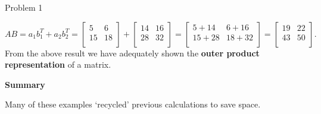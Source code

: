 \begin{problem}{Problem 1}
\begin{Highlight}[Solution]
        \begin{equation*}
            AB = a_{1}b_{1}^{T} + a_{2}b_{2}^{T} = 
            \begin{bmatrix}
                5 & 6 \\
                15 & 18 \\
            \end{bmatrix}
            + 
            \begin{bmatrix}
                14 & 16 \\
                28 & 32 \\
            \end{bmatrix}
            = 
            \begin{bmatrix}
                5 + 14 & 6 + 16 \\
                15 + 28 & 18 + 32 \\
            \end{bmatrix}
            = 
            \begin{bmatrix}
                19 & 22 \\
                43 & 50 \\
            \end{bmatrix}.
        \end{equation*}
        From the above result we have adequately shown the \textbf{outer product representation} of a matrix. \vspace*{1em}

        \noindent \textbf{Summary} \vspace*{1em}

        Many of these examples `recycled' previous calculations to save space.
    \end{Highlight}
\end{problem}

